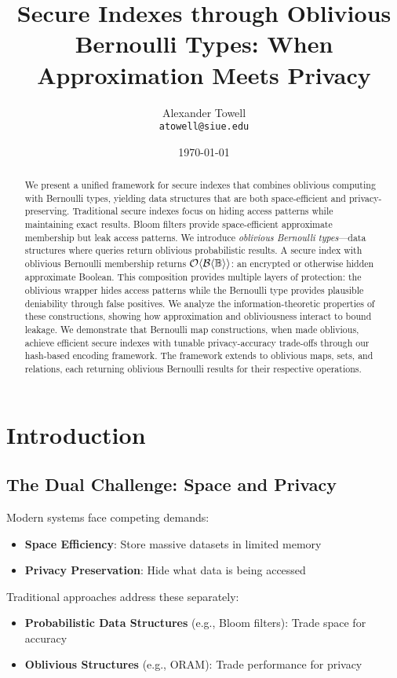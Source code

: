 \documentclass[11pt,final,hidelinks]{article}
\title{Secure Indexes through Oblivious Bernoulli Types: When Approximation Meets Privacy}
\author{
    Alexander Towell\\
    \texttt{atowell@siue.edu}
}
\date{\today}
\newcommand{\BernBool}{\mathcal{B}\langle \Bool \rangle}
\begin{document}
\maketitle

\begin{abstract}
We present a unified framework for secure indexes that combines oblivious computing with Bernoulli types, yielding data structures that are both space-efficient and privacy-preserving. Traditional secure indexes focus on hiding access patterns while maintaining exact results. Bloom filters provide space-efficient approximate membership but leak access patterns. We introduce \emph{oblivious Bernoulli types}—data structures where queries return oblivious probabilistic results. A secure index with oblivious Bernoulli membership returns $\Obv{\BernBool}$: an encrypted or otherwise hidden approximate Boolean. This composition provides multiple layers of protection: the oblivious wrapper hides access patterns while the Bernoulli type provides plausible deniability through false positives. We analyze the information-theoretic properties of these constructions, showing how approximation and obliviousness interact to bound leakage. We demonstrate that Bernoulli map constructions, when made oblivious, achieve efficient secure indexes with tunable privacy-accuracy trade-offs through our hash-based encoding framework. The framework extends to oblivious maps, sets, and relations, each returning oblivious Bernoulli results for their respective operations.
\end{abstract}

\ObliviousNotationGuide

\section{Introduction}

\subsection{The Dual Challenge: Space and Privacy}

Modern systems face competing demands:
\begin{itemize}
    \item \textbf{Space Efficiency}: Store massive datasets in limited memory
    \item \textbf{Privacy Preservation}: Hide what data is being accessed
\end{itemize}

Traditional approaches address these separately:
\begin{itemize}
    \item \textbf{Probabilistic Data Structures} (e.g., Bloom filters): Trade space for accuracy
    \item \textbf{Oblivious Structures} (e.g., ORAM): Trade performance for privacy
\end{itemize}
\end{document}
